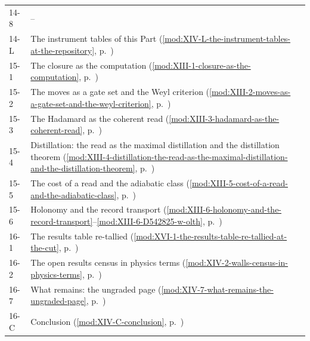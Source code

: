 {\begin{longtable}{p{11mm}p{70mm}p{60mm}}
14-8 & -- &  \\
14-L & The instrument tables of this Part (\ref{mod:XIV-L-the-instrument-tables-at-the-repository}, p.~\pageref{mod:XIV-L-the-instrument-tables-at-the-repository}) &  \\
15-1 & The closure as the computation (\ref{mod:XIII-1-closure-as-the-computation}, p.~\pageref{mod:XIII-1-closure-as-the-computation}) &  \\
15-2 & The moves as a gate set and the Weyl criterion (\ref{mod:XIII-2-moves-as-a-gate-set-and-the-weyl-criterion}, p.~\pageref{mod:XIII-2-moves-as-a-gate-set-and-the-weyl-criterion}) &  \\
15-3 & The Hadamard as the coherent read (\ref{mod:XIII-3-hadamard-as-the-coherent-read}, p.~\pageref{mod:XIII-3-hadamard-as-the-coherent-read}) &  \\
15-4 & Distillation: the read as the maximal distillation and the distillation theorem (\ref{mod:XIII-4-distillation-the-read-as-the-maximal-distillation-and-the-distillation-theorem}, p.~\pageref{mod:XIII-4-distillation-the-read-as-the-maximal-distillation-and-the-distillation-theorem}) &  \\
15-5 & The cost of a read and the adiabatic class (\ref{mod:XIII-5-cost-of-a-read-and-the-adiabatic-class}, p.~\pageref{mod:XIII-5-cost-of-a-read-and-the-adiabatic-class}) &  \\
15-6 & Holonomy and the record transport (\ref{mod:XIII-6-holonomy-and-the-record-transport}--\ref{mod:XIII-6-D542825-w-olth}, p.~\pageref{mod:XIII-6-holonomy-and-the-record-transport}) &  \\
16-1 & The results table re-tallied (\ref{mod:XVI-1-the-results-table-re-tallied-at-the-cut}, p.~\pageref{mod:XVI-1-the-results-table-re-tallied-at-the-cut}) &  \\
16-2 & The open results census in physics terms (\ref{mod:XIV-2-walls-census-in-physics-terms}, p.~\pageref{mod:XIV-2-walls-census-in-physics-terms}) &  \\
16-7 & What remains: the ungraded page (\ref{mod:XIV-7-what-remains-the-ungraded-page}, p.~\pageref{mod:XIV-7-what-remains-the-ungraded-page}) &  \\
16-C & Conclusion (\ref{mod:XIV-C-conclusion}, p.~\pageref{mod:XIV-C-conclusion}) &  \\
\hline\end{longtable}}
